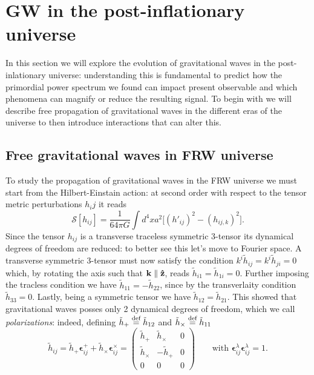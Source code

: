 \chapter{GW in the post-inflationary universe}
In this section we will explore the evolution of gravitational waves in the post-inlationary universe: understanding this is fundamental to predict how the primordial power spectrum we found can impact present observable and which phenomena can magnify or reduce the resulting signal. To begin with we will describe free propagation of gravitational waves in the different eras of the universe to then introduce interactions that can alter this. 

\section{Free gravitational waves in FRW universe}
\label{sec:free_GW}
To study the propagation of gravitational waves in the FRW universe we must start from the Hilbert-Einstain action: at second order with respect to the tensor metric perturbations $h_ij$ it reads
\begin{equation*}
    \mathcal{S} [h_{ij}]=\frac{1}{64\pi G}\int d^4xa^2\Big[(h'_{ij})^2-(h_{ij,k})^2\Big].
\end{equation*}
Since the tensor $h_{ij}$ is a transverse traceless symmetric 3-tensor its dynamical degrees of freedom are reduced: to better see this let's move to Fourier space. A transverse symmetric 3-tensor must now satisfy the condition $k^i\tilde h_{ij}=k^i \tilde h_{ji}=0$ which, by rotating the axis such that $\mathbf k\parallel\mathbf{\hat{z}}$, reads $\tilde{h}_{i1}=\tilde{h}_{1i}=0$. Further imposing the tracless condition we have $\tilde{h}_{11}=-\tilde h_{22}$, since by the transverlaity condition $\tilde{h}_{33}=0$. Lastly, being a symmetric tensor we have $\tilde{h}_{12}=\tilde{h}_{21}$. This showed that gravitational waves posses only 2 dynamical degrees of freedom, which we call \emph{polarizations}: indeed, defining $\tilde{h}_+\stackrel{\text{def}}{=}\tilde{h}_{12}$ and $ \tilde{h}_\times\stackrel{\text{def}}{=}\tilde{h}_{11}$
\begin{equation}
    \tilde{h}_{ij}=\tilde{h}_+\boldsymbol{\epsilon}_{ij}^++\tilde{h}_{\times}\boldsymbol{\epsilon}_{ij}^\times=
    \begin{pmatrix}
\tilde h_+ & \tilde h_\times & 0  \\ 
\tilde h_\times & -\tilde h_+ & 0  \\
0&0&0
    \end{pmatrix}\qquad\text{with }\boldsymbol{\epsilon}^\lambda_{ij}\boldsymbol{\epsilon}^{\lambda}_{ij}=1.
    \label{eq:GW-polarizations}
\end{equation}
